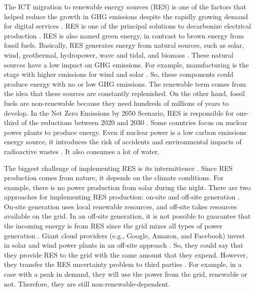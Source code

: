 The ICT migration to renewable energy sources (RES) is one of the factors that helped reduce the growth in GHG emissions despite the rapidly growing demand for digital services \cite{centres2022data}. RES is one of the principal solutions to decarbonize electrical production \cite{olabi2022renewable, rostirolla2022survey}. RES is also named green energy, in contrast to brown energy from fossil fuels. Basically, RES generates energy from natural sources, such as solar, wind, geothermal, hydropower, wave and tidal, and biomass \cite{augustine2012renewable, panwar2011role, rostirolla2022survey, UNREnewable, gross2003progress}. These natural sources have a low impact on GHG emissions. For example, manufacturing is the stage with higher emissions for wind and solar \cite{amponsah2014greenhouse}. So, these components could produce energy with no or low GHG emissions. The renewable term comes from the idea that these sources are constantly replenished. On the other hand, fossil fuels are non-renewable because they need hundreds of millions of years to develop. In the Net Zero Emissions by 2050 Scenario, RES is responsible for one-third of the reductions between 2020 and 2030 \cite{renewables2022}. Some countries focus on nuclear power plants to produce energy. Even if nuclear power is a low carbon emissions energy source, it introduces the risk of accidents and environmental impacts of radioactive wastes \cite{kunsch2014nuclear}. It also consumes a lot of water.

The biggest challenge of implementing RES is its intermittence \cite{rostirolla2022survey}. Since RES production comes from nature, it depends on the climate conditions. For example, there is no power production from solar during the night. There are two approaches for implementing RES production: on-site and off-site generation \cite{ren2012carbon}. On-site generation uses local renewable resources, and off-site takes resources available on the grid. In an off-site generation, it is not possible to guarantee that the incoming energy is from RES since the grid mixes all types of power generation \cite{rostirolla2022survey}. Giant cloud providers (e.g., Google, Amazon, and Facebook) invest in solar and wind power plants in an off-site approach \cite{Masanet984, branscombe2020google, amazon2023}. So, they could say that they provide RES to the grid with the same amount that they expend. However, they transfer the RES uncertainty problem to third parties \cite{rostirolla2022survey}. For example, in a case with a peak in demand, they will use the power from the grid, renewable or not. Therefore, they are still non-renewable-dependent.

